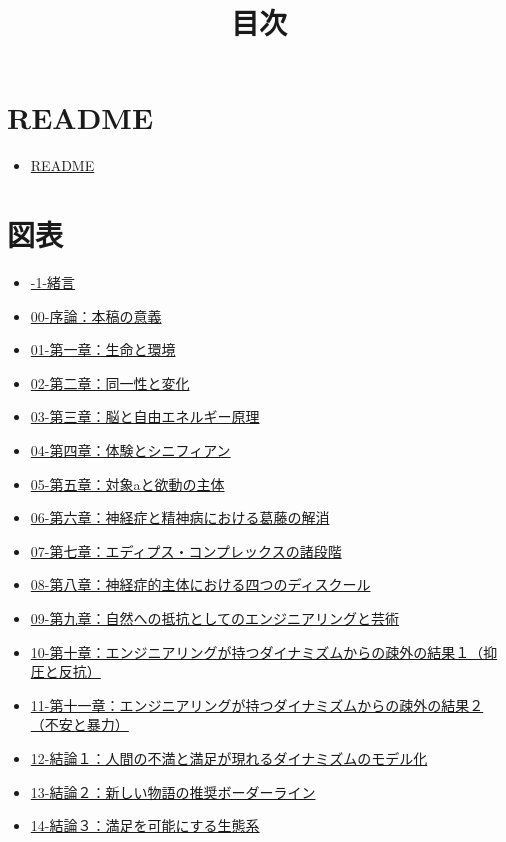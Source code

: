 \documentclass[8pt, a5paper]{ltjsarticle}
\title{目次}
\author{}
\date{}
\author{}
\date{}
\providecommand{\tightlist}{%
  \setlength{\itemsep}{0pt}\setlength{\parskip}{0pt}}
\begin{document}
\maketitle

\section{README}\label{readme}

\begin{itemize}
\tightlist
\item
  \href{aoko-yano-public/personal_knowledge_management/stock/text/虚無・無知・飢餓―不安の時代における諸学の綜合/README}{README}
\end{itemize}

\section{図表}\label{ux56f3ux8868}

\begin{itemize}
\tightlist
\item
  \url{-1-緒言}
\item
  \url{00-序論：本稿の意義}
\item
  \url{01-第一章：生命と環境}
\item
  \url{02-第二章：同一性と変化}
\item
  \url{03-第三章：脳と自由エネルギー原理}
\item
  \url{04-第四章：体験とシニフィアン}
\item
  \url{05-第五章：対象aと欲動の主体}
\item
  \url{06-第六章：神経症と精神病における葛藤の解消}
\item
  \url{07-第七章：エディプス・コンプレックスの諸段階}
\item
  \url{08-第八章：神経症的主体における四つのディスクール}
\item
  \url{09-第九章：自然への抵抗としてのエンジニアリングと芸術}
\item
  \url{10-第十章：エンジニアリングが持つダイナミズムからの疎外の結果１（抑圧と反抗）}
\item
  \url{11-第十一章：エンジニアリングが持つダイナミズムからの疎外の結果２（不安と暴力）}
\item
  \url{12-結論１：人間の不満と満足が現れるダイナミズムのモデル化}
\item
  \url{13-結論２：新しい物語の推奨ボーダーライン}
\item
  \url{14-結論３：満足を可能にする生態系}
\end{itemize}
\end{document}
